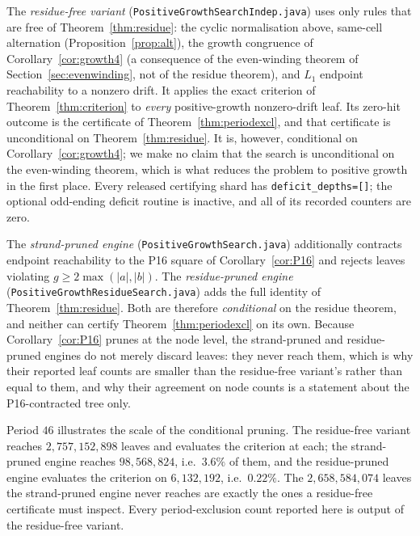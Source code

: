 \documentclass[11pt,reqno]{amsart}
\theoremstyle{plain}
\theoremstyle{definition}
\newcommand{\growth}{g}
\begin{document}
The \emph{residue-free variant} (\texttt{PositiveGrowthSearchIndep.java}) uses only
rules that are free of Theorem~\ref{thm:residue}: the cyclic normalisation above,
same-cell alternation (Proposition~\ref{prop:alt}), the growth congruence of
Corollary~\ref{cor:growth4} (a consequence of the even-winding theorem of
Section~\ref{sec:evenwinding}, not of the residue theorem), and $L_1$ endpoint
reachability to a nonzero drift. It applies the exact
criterion of
Theorem~\ref{thm:criterion} to \emph{every} positive-growth nonzero-drift leaf. Its
zero-hit outcome is the certificate of Theorem~\ref{thm:periodexcl}, and that
certificate is unconditional on Theorem~\ref{thm:residue}. It is, however,
conditional on Corollary~\ref{cor:growth4}; we make no claim that the search is
unconditional on the even-winding theorem, which is what reduces the problem to
positive growth in the first place. Every released certifying shard has
\texttt{deficit\_depths=[]}; the optional odd-ending deficit routine is inactive, and
all of its recorded counters are zero.

The \emph{strand-pruned engine} (\texttt{PositiveGrowthSearch.java}) additionally
contracts endpoint reachability to the P16 square of Corollary~\ref{cor:P16} and
rejects leaves violating $\growth\ge2\max(|a|,|b|)$. The \emph{residue-pruned engine}
(\texttt{PositiveGrowthResidueSearch.java}) adds the full identity of
Theorem~\ref{thm:residue}. Both are therefore \emph{conditional} on the residue
theorem, and neither can certify Theorem~\ref{thm:periodexcl} on its own. Because
Corollary~\ref{cor:P16} prunes at the node level, the strand-pruned and
residue-pruned engines do not merely discard leaves: they never reach them, which is
why their reported leaf counts are smaller than the residue-free variant's rather than
equal to them, and why their agreement on node counts is a statement about the
P16-contracted tree only.

Period $46$ illustrates the scale of the conditional pruning. The residue-free
variant reaches $2{,}757{,}152{,}898$
leaves and evaluates the criterion at each; the strand-pruned engine reaches
$98{,}568{,}824$, i.e.\ $3.6\%$ of them, and the residue-pruned engine evaluates the
criterion on $6{,}132{,}192$, i.e.\ $0.22\%$. The $2{,}658{,}584{,}074$ leaves the
strand-pruned engine never reaches are exactly the ones a residue-free certificate
must inspect. Every period-exclusion count reported here is output of the residue-free
variant.
\end{document}
